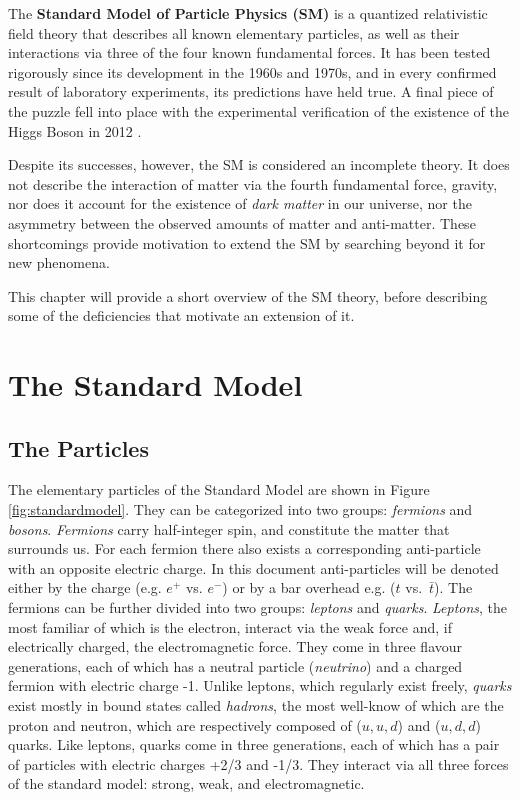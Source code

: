 \label{chapter:theory}

\newlength{\savedunitlength}
\setlength{\unitlength}{2em}

The \textbf{Standard Model of Particle Physics (SM)} \cite{peskin,schwartz,pdg_rev,Griffiths} is a quantized relativistic field theory that describes all known elementary particles, as well as their interactions via three of the four known fundamental forces. It has been tested rigorously since its development in the 1960s and 1970s, and in every confirmed result of laboratory experiments, its predictions have held true. A final piece of the puzzle fell into place with the experimental verification of the existence of the Higgs Boson in 2012 \cite{HiggsDiscovery}.

Despite its successes, however, the SM is considered an incomplete theory. It does not describe the interaction of matter via the fourth fundamental force, gravity, nor does it account for the existence of \textit{dark matter} in our universe, nor the asymmetry between the observed amounts of matter and anti-matter. These shortcomings provide motivation to extend the SM by searching beyond it for new phenomena.

This chapter will provide a short overview of the SM theory, before describing some of the deficiencies that motivate an extension of it.

\section{The Standard Model}

\subsection{The Particles}
The elementary particles of the Standard Model are shown in Figure \ref{fig:standardmodel}. They can be categorized into two groups: \textit{fermions} and \textit{bosons}. \textit{Fermions} carry half-integer spin, and constitute the matter that surrounds us. For each fermion there also exists a corresponding anti-particle with an opposite electric charge. In this document anti-particles will be denoted either by the charge (e.g. $e^{+}$ vs. $e^{-}$) or by a bar overhead e.g. ($t$ vs.~$\bar{t}$). The fermions can be further divided into two groups: \textit{leptons} and \textit{quarks}. \textit{Leptons}, the most familiar of which is the electron, interact via the weak force and, if electrically charged, the electromagnetic force. They come in three flavour generations, each of which has a neutral particle (\textit{neutrino}) and a charged fermion with electric charge -1. Unlike leptons, which regularly exist freely, \textit{quarks} exist mostly in bound states called \textit{hadrons}, the most well-know of which are the proton and neutron, which are respectively composed of ($u,u,d$) and ($u,d,d$) quarks. Like leptons, quarks come in three generations, each of which has a pair of particles with electric charges +2/3 and -1/3. They interact via all three forces of the standard model: strong, weak, and electromagnetic.

